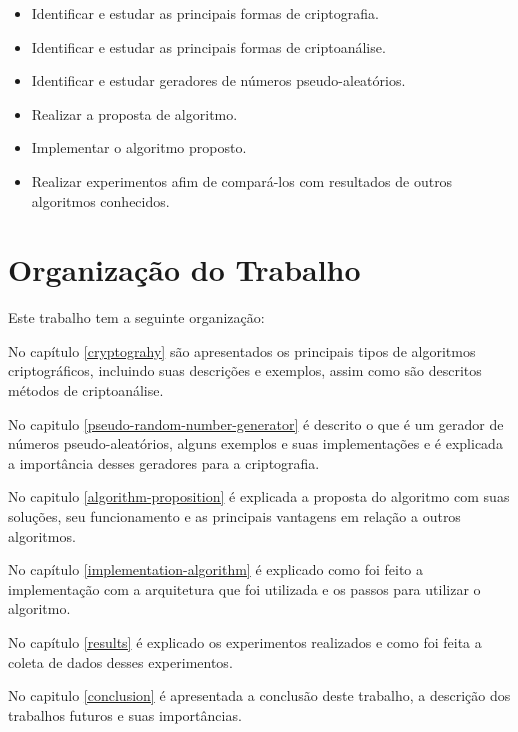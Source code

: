 \begin{itemize}
	\item Identificar e estudar as principais formas de criptografia.
	\item Identificar e estudar as principais formas de criptoanálise.
	\item Identificar e estudar geradores de números pseudo-aleatórios.
	\item Realizar a proposta de algoritmo.
	\item Implementar o algoritmo proposto.
	\item Realizar experimentos afim de compará-los com resultados de outros algoritmos conhecidos.
\end{itemize}

\section{Organização do Trabalho}
\label{paper-organization}

Este trabalho tem a seguinte organização:

No capítulo \ref{cryptograhy} são apresentados os principais tipos de algoritmos criptográficos, incluindo suas descrições e exemplos, assim como são descritos métodos de criptoanálise.

No capitulo \ref{pseudo-random-number-generator} é descrito o que é um gerador de números pseudo-aleatórios, alguns exemplos e suas implementações e é explicada a importância desses geradores para a criptografia. 

No capitulo \ref{algorithm-proposition} é explicada a proposta do algoritmo com suas soluções, seu funcionamento e as principais vantagens em relação a outros algoritmos.

No capítulo \ref{implementation-algorithm} é explicado como foi feito a implementação com a arquitetura que foi utilizada e os passos para utilizar o algoritmo.

No capítulo \ref{results} é explicado os experimentos realizados e como foi feita a coleta de dados desses experimentos. 

No capitulo \ref{conclusion} é apresentada a conclusão deste trabalho, a descrição dos trabalhos futuros e suas importâncias.